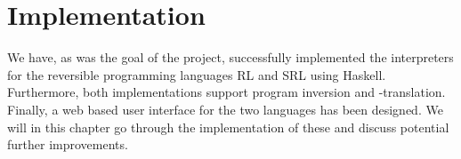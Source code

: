 \chapter{Implementation}

We have, as was the goal of the project, successfully implemented the interpreters for the reversible programming languages RL and SRL using Haskell. Furthermore, both implementations support program inversion and -translation. Finally, a web based user interface for the two languages has been designed. We will in this chapter go through the implementation of these and discuss potential further improvements.







